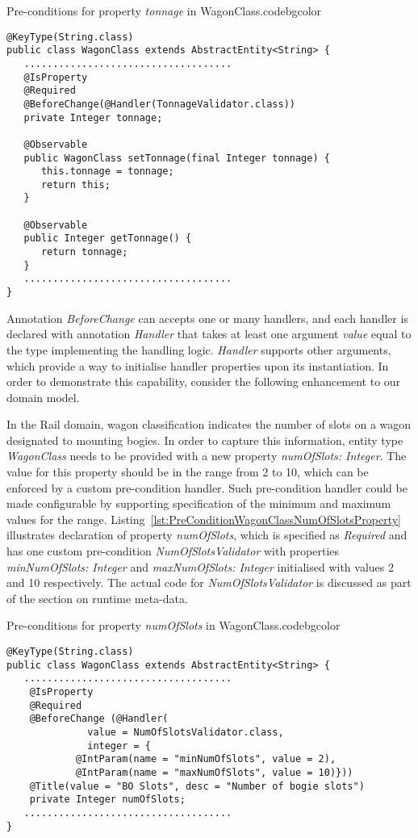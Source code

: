   \begin{code}{Pre-conditions for property \emph{tonnage} in WagonClass.}{\label{lst:PreConditionWagonClassTonnageProperty}}{codebgcolor}
    \begin{lstlisting}
@KeyType(String.class)
public class WagonClass extends AbstractEntity<String> {  
   ....................................
   @IsProperty
   @Required   
   @BeforeChange(@Handler(TonnageValidator.class))   
   private Integer tonnage;

   @Observable   
   public WagonClass setTonnage(final Integer tonnage) {
      this.tonnage = tonnage;
      return this;
   }

   @Observable   
   public Integer getTonnage() {      
      return tonnage;
   }
   ....................................
}
    \end{lstlisting}
  \end{code}
 
  Annotation \emph{BeforeChange} can accepts one or many handlers, and each handler is declared with annotation \emph{Handler} that takes at least one argument \emph{value} equal to the type implementing the handling logic.
  \emph{Handler} supports other arguments, which provide a way to initialise handler properties upon its instantiation.
  In order to demonstrate this capability, consider the following enhancement to our domain model.
  
  In the Rail domain, wagon classification indicates the number of slots on a wagon designated to mounting bogies.
  In order to capture this information, entity type \emph{WagonClass} needs to be provided with a new property \emph{numOfSlots: Integer}.
  The value for this property should be in the range from 2 to 10, which can be enforced by a custom pre-condition handler.
  Such pre-condition handler could be made configurable by supporting specification of the minimum and maximum values for the range.
  Listing~\ref{lst:PreConditionWagonClassNumOfSlotsProperty} illustrates declaration of property \emph{numOfSlots}, which is specified as \emph{Required} and has one custom pre-condition \emph{NumOfSlotsValidator} with properties \emph{minNumOfSlots: Integer} and \emph{maxNumOfSlots: Integer} initialised with values 2 and 10 respectively.
  The actual code for \emph{NumOfSlotsValidator} is discussed as part of the section on runtime meta-data.

  \begin{code}{Pre-conditions for property \emph{numOfSlots} in WagonClass.}{\label{lst:PreConditionWagonClassNumOfSlotsProperty}}{codebgcolor}
    \begin{lstlisting}
@KeyType(String.class)
public class WagonClass extends AbstractEntity<String> {  
   ....................................
    @IsProperty
    @Required
    @BeforeChange (@Handler(
		      value = NumOfSlotsValidator.class, 
		      integer = {
			@IntParam(name = "minNumOfSlots", value = 2), 
			@IntParam(name = "maxNumOfSlots", value = 10)}))
    @Title(value = "BO Slots", desc = "Number of bogie slots")
    private Integer numOfSlots;
   ....................................
}
    \end{lstlisting}
  \end{code}



